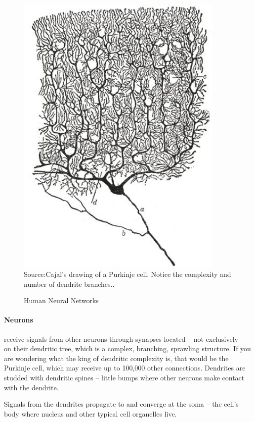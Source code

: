 \documentclass[paper=a4, fontsize=11pt]{scrartcl} %
\numberwithin{equation}{section} %
\numberwithin{figure}{section} %
\numberwithin{table}{section} %
\begin{document}
\begin{figure}[H]
    \centering
    \caption{Human Neural Networks}
    \includegraphics[width=0.9\textwidth]{./data/neural-netwrok.jpg}
    \footnotesize{Source:Cajal’s drawing of a Purkinje cell. Notice the complexity and number of dendrite branches..}
    \label{fig:my_picture}
\end{figure}

\paragraph{Neurons}
receive signals from other neurons through synapses located – not exclusively – on their dendritic tree, which is a complex, branching, sprawling structure. If you are wondering what the king of dendritic complexity is, that would be the Purkinje cell, which may receive up to 100,000 other connections. Dendrites are studded with dendritic spines – little bumps where other neurons make contact with the dendrite.

\vspace{10pt}
Signals from the dendrites propagate to and converge at the soma – the cell’s body where nucleus and other typical cell organelles live.
\end{document}
